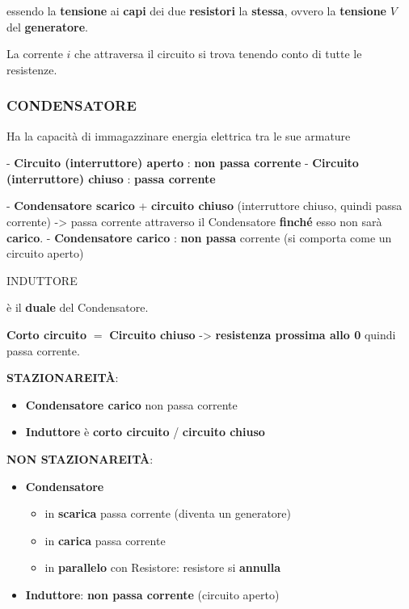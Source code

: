 \documentclass{article}
\begin{document}
essendo la \textbf{tensione} ai \textbf{capi} dei due \textbf{resistori} la \textbf{stessa}, ovvero la \textbf{tensione} $V$ del \textbf{generatore}.

La corrente $i$ che attraversa il circuito si trova tenendo conto di tutte le resistenze. 

\subsubsection{CONDENSATORE}

Ha la capacità di immagazzinare energia elettrica tra le sue armature

- \textbf{Circuito (interruttore) aperto} : \textbf{non passa corrente}
- \textbf{Circuito (interruttore) chiuso} : \textbf{passa corrente}

- \textbf{Condensatore scarico} + \textbf{circuito chiuso} (interruttore chiuso, quindi passa corrente) -> passa corrente attraverso il Condensatore \textbf{finché} esso non sarà \textbf{carico}.
- \textbf{Condensatore carico} : \textbf{non passa} corrente (si comporta come un circuito aperto)

INDUTTORE

è il \textbf{duale} del Condensatore.

\textbf{Corto circuito} $=$ \textbf{Circuito chiuso} -> \textbf{resistenza prossima allo 0} quindi passa corrente.

\textbf{STAZIONAREITÀ}:
\begin{itemize}
  \item \textbf{Condensatore carico} non passa corrente
  \item \textbf{Induttore} è \textbf{corto circuito} / \textbf{circuito chiuso}
\end{itemize}

\textbf{NON STAZIONAREITÀ}:

\begin{itemize}
  \item \textbf{Condensatore} 
  \begin{itemize}
    \item in \textbf{scarica} passa corrente (diventa un generatore)
    \item in \textbf{carica} passa corrente
    \item in \textbf{parallelo} con Resistore: resistore si \textbf{annulla}
  \end{itemize}
  \item \textbf{Induttore}: \textbf{non passa corrente} (circuito aperto) 
\end{itemize}
\end{document}
